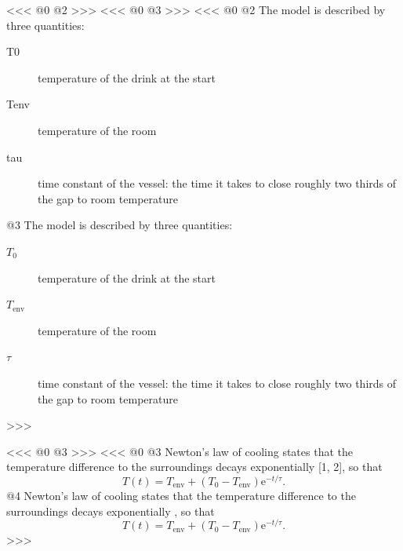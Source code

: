 <<<
@0
@2
>>>
<<<
@0
@3
>>>
<<<
@0
@2
The model is described by three quantities:
\begin{description}
    \item[T0] temperature of the drink at the start
    \item[Tenv] temperature of the room
    \item[tau] time constant of the vessel: the time it takes to close roughly two thirds of the gap to room temperature
\end{description}
@3
The model is described by three quantities:
\begin{description}
    \item[$T_0$] temperature of the drink at the start
    \item[$T_{\mathrm{env}}$] temperature of the room
    \item[$\tau$] time constant of the vessel: the time it takes to close roughly two thirds of the gap to room temperature
\end{description}
>>>

<<<
@0
@3
>>>
<<<
@0
@3
Newton's law of cooling states that the temperature difference to the surroundings decays exponentially [1, 2],
so that
\begin{equation}
    T(t) = T_{\mathrm{env}} + (T_0 - T_{\mathrm{env}}) \mathrm{e}^{-t/\tau}.
\end{equation}
@4
Newton's law of cooling states that the temperature difference to the surroundings decays exponentially \parencite{halliday2018,incropera2007},
so that
\begin{equation}\label{eq:cooling}
    T(t) = T_{\mathrm{env}} + (T_0 - T_{\mathrm{env}}) \mathrm{e}^{-t/\tau}.
\end{equation}
>>>

